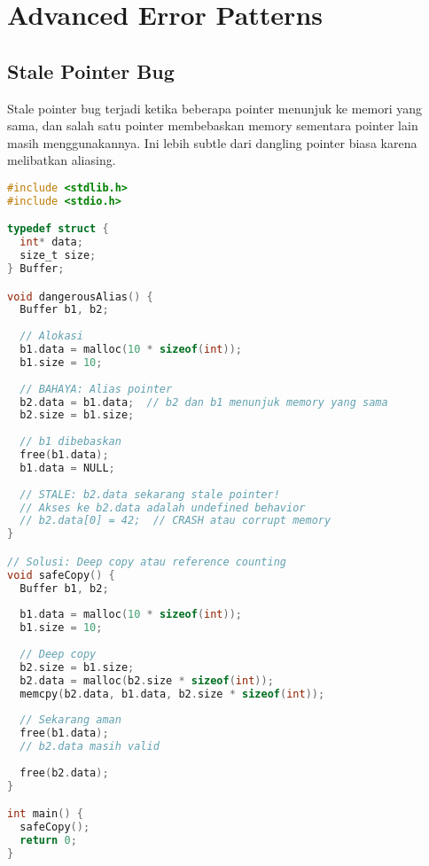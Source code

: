 \documentclass[../main.tex]{subfiles}
\begin{document}
\section{Advanced Error Patterns}

\subsection{Stale Pointer Bug}
Stale pointer bug terjadi ketika beberapa pointer menunjuk ke memori yang sama, dan salah satu pointer membebaskan memory sementara pointer lain masih menggunakannya. Ini lebih subtle dari dangling pointer biasa karena melibatkan aliasing.

\begin{lstlisting}[language=C, caption={Stale pointer bug}]
#include <stdlib.h>
#include <stdio.h>

typedef struct {
  int* data;
  size_t size;
} Buffer;

void dangerousAlias() {
  Buffer b1, b2;
  
  // Alokasi
  b1.data = malloc(10 * sizeof(int));
  b1.size = 10;
  
  // BAHAYA: Alias pointer
  b2.data = b1.data;  // b2 dan b1 menunjuk memory yang sama
  b2.size = b1.size;
  
  // b1 dibebaskan
  free(b1.data);
  b1.data = NULL;
  
  // STALE: b2.data sekarang stale pointer!
  // Akses ke b2.data adalah undefined behavior
  // b2.data[0] = 42;  // CRASH atau corrupt memory
}

// Solusi: Deep copy atau reference counting
void safeCopy() {
  Buffer b1, b2;
  
  b1.data = malloc(10 * sizeof(int));
  b1.size = 10;
  
  // Deep copy
  b2.size = b1.size;
  b2.data = malloc(b2.size * sizeof(int));
  memcpy(b2.data, b1.data, b2.size * sizeof(int));
  
  // Sekarang aman
  free(b1.data);
  // b2.data masih valid
  
  free(b2.data);
}

int main() {
  safeCopy();
  return 0;
}
\end{lstlisting}
\end{document}
